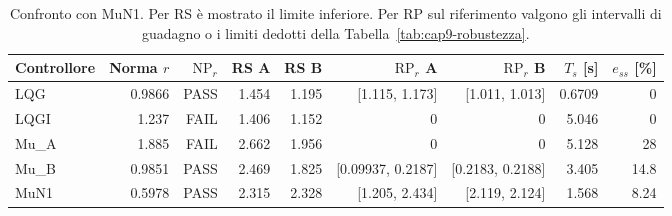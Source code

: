 \begin{table}[htbp]\centering\small
\setlength{\tabcolsep}{4pt}
\begin{tabular}{lrrrrrrrr}\toprule
Controllore & Norma $r$ & $\mathrm{NP}_r$ & RS A & RS B & $\mathrm{RP}_r$ A & $\mathrm{RP}_r$ B & $T_s$ [s] & $e_{ss}$ [\%]\\\midrule
LQG & \num{0.9866} & PASS & \num{1.454} & \num{1.195} & [\num{1.115}, \num{1.173}] & [\num{1.011}, \num{1.013}] & \num{0.6709} & 0\\
LQGI & \num{1.237} & FAIL & \num{1.406} & \num{1.152} & 0 & 0 & \num{5.046} & 0\\
Mu\_A & \num{1.885} & FAIL & \num{2.662} & \num{1.956} & 0 & 0 & \num{5.128} & \num{28}\\
Mu\_B & \num{0.9851} & PASS & \num{2.469} & \num{1.825} & [\num{0.09937}, \num{0.2187}] & [\num{0.2183}, \num{0.2188}] & \num{3.405} & \num{14.8}\\
MuN1 & \num{0.5978} & PASS & \num{2.315} & \num{2.328} & [\num{1.205}, \num{2.434}] & [\num{2.119}, \num{2.124}] & \num{1.568} & \num{8.24}\\
\bottomrule\end{tabular}
\caption{Confronto con MuN1. Per RS è mostrato il limite inferiore. Per RP sul riferimento valgono gli intervalli di guadagno o i limiti dedotti della Tabella~\ref{tab:cap9-robustezza}.}
\label{tab:cap9-riesame-r}
\end{table}
